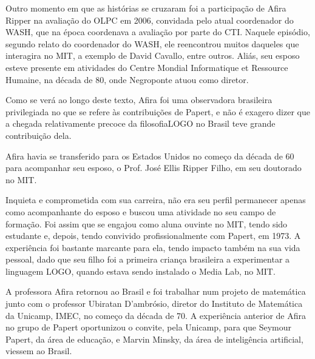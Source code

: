 \documentclass[
12pt,		%
openright,	%
twoside,  %
a4paper,			%
chapter=TITLE,		%
english,			%
french,				%
spanish,			%
brazil				%
]{USPSC-classe/USPSC}
\begin{document}
Outro momento em que as hist\'orias se cruzaram foi a participa\c{c}\~ao de Afira Ripper na avalia\c{c}\~ao do OLPC em 2006, convidada pelo atual coordenador do WASH, que na \'epoca coordenava a avalia\c{c}\~ao por parte do CTI. Naquele epis\'odio, segundo relato do coordenador do WASH, ele reencontrou muitos daqueles que interagira no MIT, a exemplo de David Cavallo, entre outros. Ali\'as, seu esposo esteve presente em atividades do Centre Mondial Informatique et Ressource Humaine, na d\'ecada de 80, onde Negroponte atuou como diretor.









Como se ver\'a ao longo deste texto, Afira foi uma observadora brasileira privilegiada no que se refere \`as contribui\c{c}\~oes de Papert, e n\~ao \'e exagero dizer que a chegada relativamente precoce da \textquotedbl filosofia\textquotedbl  LOGO no Brasil teve grande contribui\c{c}\~ao dela.









Afira havia se transferido para os Estados Unidos no come\c{c}o da d\'ecada de 60 para acompanhar seu esposo, o Prof. Jos\'e Ellis Ripper Filho, em seu doutorado no MIT.









Inquieta e comprometida com sua carreira, n\~ao era seu perfil permanecer apenas como acompanhante do esposo e buscou uma atividade no seu campo de forma\c{c}\~ao. Foi assim que se engajou como aluna ouvinte no MIT, tendo sido estudante e, depois, tendo convivido profissionalmente com Papert, em 1973. A experi\^encia foi bastante marcante para ela, tendo impacto tamb\'em na sua vida pessoal, dado que seu filho foi a primeira crian\c{c}a brasileira a experimentar a linguagem LOGO, quando estava sendo instalado o Media Lab, no MIT.









A professora Afira retornou ao Brasil e foi trabalhar num projeto de matem\'atica junto com o professor Ubiratan D’ambr\'osio, diretor do Instituto de Matem\'atica da Unicamp, IMEC, no come\c{c}o da d\'ecada de 70. A experi\^encia anterior de Afira no grupo de Papert oportunizou o convite, pela Unicamp, para que Seymour Papert, da \'area de educa\c{c}\~ao, e Marvin Minsky, da \'area de intelig\^encia artificial, viessem ao Brasil.
\end{document}
